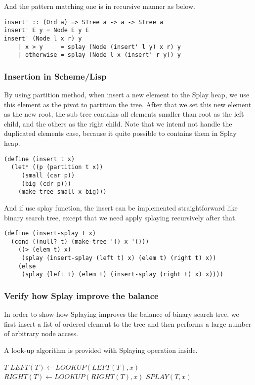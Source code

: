 \documentclass{article}
\begin{document}
And the pattern matching one is in recursive manner as below.

\begin{lstlisting}
insert' :: (Ord a) => STree a -> a -> STree a
insert' E y = Node E y E
insert' (Node l x r) y 
    | x > y     = splay (Node (insert' l y) x r) y
    | otherwise = splay (Node l x (insert' r y)) y
\end{lstlisting}

\subsubsection*{Insertion in Scheme/Lisp}

By using partition method, when insert a new element to the Splay
heap, we use this element as the pivot to partition the tree.
After that we set this new element as the new root, the sub tree
contains all elements smaller than root as the left child, and
the others as the right child. Note that we intend not handle the
duplicated elements case, because it quite possible to contains
them in Splay heap.

\lstset{language=lisp}
\begin{lstlisting}
(define (insert t x)
  (let* ((p (partition t x))
	 (small (car p))
	 (big (cdr p)))
    (make-tree small x big)))
\end{lstlisting}

And if use splay function, the insert can be implemented straightforward
like binary search tree, except that we need apply splaying recursively 
after that.

\begin{lstlisting}
(define (insert-splay t x)
  (cond ((null? t) (make-tree '() x '()))
	((> (elem t) x)
	 (splay (insert-splay (left t) x) (elem t) (right t) x))
	(else
	 (splay (left t) (elem t) (insert-splay (right t) x) x))))
\end{lstlisting}

\subsubsection{Verify how Splay improve the balance}
In order to show how Splaying improves the balance of binary search
tree, we first insert a list of ordered element to the tree and then
performs a large number of arbitrary node access.

A look-up algorithm is provided with Splaying operation inside. 

\begin{algorithmic}[1]
    \State \Return $T$
    \State $LEFT(T) \gets LOOKUP(LEFT(T), x)$
  \Else
    \State $RIGHT(T) \gets LOOKUP(RIGHT(T), x)$
  \EndIf
  \State \Return $SPLAY(T, x)$
\EndFunction
\end{algorithmic}
\end{document}
